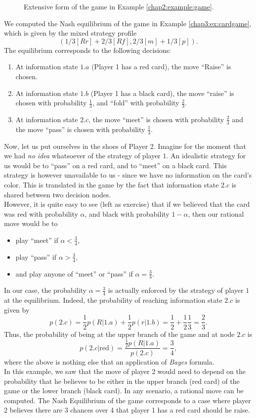 \begin{example}
\begin{figure}[!ht]
\caption{Extensive form of the game in Example \ref{chap2:example:game}.}
\label{chap4:example:figtree}
\end{figure}
 We computed the Nash equilibrium of the game in Example \ref{chap3:ex:cardgame}, which is given by the mixed strategy profile
$$(1/3[Rr] + 2/3[Rf], 2/3[m] + 1/3[p]).$$
The equilibrium corresponds to the following decisions:
\begin{enumerate}
\item At information state $1.a$ (Player 1 has a red card), the move ``Raise'' is chosen.
\item At information state $1.b$ (Player 1 has a black card), the move ``raise'' is chosen with probability $\frac{1}{3}$, and ``fold'' with probability $\frac{2}{3}$.
\item At information state $2.c$, the move ``meet'' is chosen with probability $\frac{2}{3}$ and the move ``pass'' is chosen with probability $\frac{1}{3}$.
\end{enumerate}
Now, let us put ourselves in the shoes of Player 2. Imagine for the moment that we had \emph{no idea} whatsoever of the strategy of player $1$.  An idealistic strategy for us would be to ``pass'' on a red card, and to ``meet'' on a black card. This strategy is however unavailable to us - since we have no information on the card's color. This is translated in the game by the fact that information state $2.c$ is shared between two decision nodes.\\
However, it is quite easy to see (left as exercise) that  if we believed that the card was red with probability $\alpha$, and black with probability $1-\alpha$, then our rational move would be to
\begin{itemize}
\item play ``meet'' if $\alpha < \frac{3}{4}$,
\item play ``pass'' if $\alpha > \frac{3}{4}$,
\item and play anyone of ``meet'' or ``pass'' if $\alpha = \frac{3}{4}$.
\end{itemize}
In our case, the probability $\alpha = \frac{3}{4}$ is actually enforced by the strategy of player $1$ at the equilibrium.
Indeed, the probability of reaching information state $2.c$ is given by
$$ p(2.c) = \frac{1}{2}p(R | 1.a) + \frac{1}{2} p(r |  1.b) = \frac{1}{2} + \frac{1}{2} \frac{1}{3} = \frac{2}{3}. $$
Thus, the probability of being at the upper branch of the game and at node $2.c$ is
$$ p(2.c |  \text{red}) = \frac{\frac{1}{2}p(R | 1.a)}{p(2.c)} = \frac{3}{4},$$
where the above is nothing else that an application of \emph{Bayes} formula.\\

In this example, we saw that the move of player 2 would need to depend on the probability that he believes to be either in the upper branch (red card) of the game or the lower branch (black card). In any scenario, a rational move can be computed. The Nash Equilibrium of the game corresponds to a case where player 2 believes there are 3 chances over 4 that player 1 has a red card should he raise.


\end{example}

